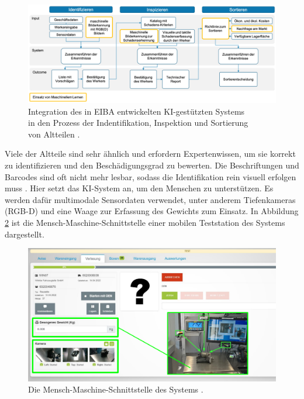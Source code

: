\begin{figure}[h]
	\centering
	\includegraphics[width=\textwidth]{figure_eiba_process.png}
	\caption{Integration des in EIBA entwickelten KI-gestützten Systems\\
	in den Prozess der Indentifikation, Inspektion und Sortierung\\
	von Altteilen \parencite{Wagner2022reziprok}.}
	\label{fig:eiba-process}
\end{figure}

Viele der Altteile sind sehr ähnlich und erfordern Expertenwissen, um sie korrekt zu identifizieren und den Beschädigungsgrad zu bewerten. Die Beschriftungen und Barcodes sind oft nicht mehr lesbar, sodass die Identifikation rein visuell erfolgen muss \parencite{Wagner2022reziprok}. Hier setzt das KI-System an, um den Menschen zu unterstützen. Es werden dafür multimodale Sensordaten verwendet, unter anderem Tiefenkameras (RGB-D) und eine Waage zur Erfassung des Gewichts zum Einsatz. In Abbildung \ref{fig:eiba-interface} ist die Mensch-Maschine-Schnittstelle einer mobilen Teststation des Systems dargestellt.

\begin{figure}[h]
	\centering
	\includegraphics[width=\textwidth]{figure_eiba_interface.png}
	\caption{Die Mensch-Maschine-Schnittstelle des Systems \parencite{Wagner2022reziprok}.}
	\label{fig:eiba-interface}
\end{figure}

